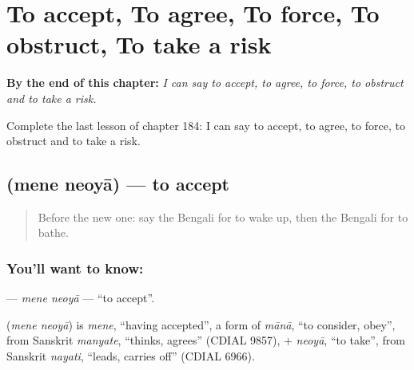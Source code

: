 
\chapter{To accept, To agree, To force, To obstruct, To take a risk}
\label{ch:bn-to-accept-to-agree-to-force-to-obstruct-to-take-a-risk}

\begin{chapteropening}
\textbf{By the end of this chapter:} \emph{I can say to accept, to agree, to force, to obstruct and to take a risk.}

Complete the last lesson of chapter 184: I can say to accept, to agree, to force, to obstruct and to take a risk.
\end{chapteropening}

\section[\texorpdfstring{\bn{মেনে} \bn{নেওয়া} (mene neoyā)}{মেনে নেওয়া (mene neoyā)}]{  (mene neoyā) — to accept}

\label{lesson:BN-C184-mene-neoya}



\begin{quote}
Before the new one: say the Bengali for to wake up, then the Bengali for to bathe.
\end{quote}

\subsection*{You'll want to know:  }
\textbf{ } — \emph{mene neoyā} — \textquotedblleft{}to accept\textquotedblright{}.

\begin{cousinweb}
\textbf{ } (\emph{mene neoyā}) is \emph{mene}, \textquotedblleft{}having accepted\textquotedblright{}, a form of \emph{mānā}, \textquotedblleft{}to consider, obey\textquotedblright{}, from Sanskrit \emph{manyate}, \textquotedblleft{}thinks, agrees\textquotedblright{} (CDIAL 9857), + \emph{neoyā}, \textquotedblleft{}to take\textquotedblright{}, from Sanskrit \emph{nayati}, \textquotedblleft{}leads, carries off\textquotedblright{} (CDIAL 6966).
\end{cousinweb}

